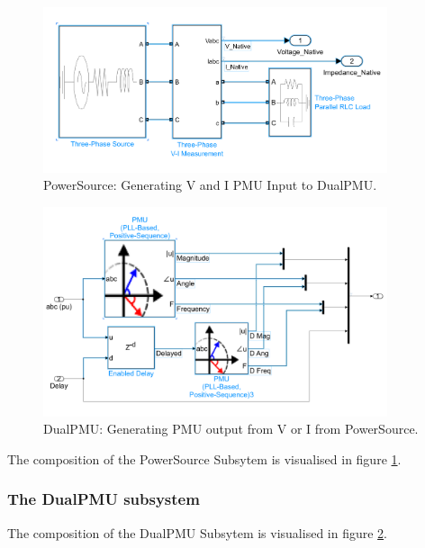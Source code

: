  \begin{figure}
\includegraphics[width=0.9\textwidth]{figures/PowerSourceSubsystem.png}
\caption[PowerSource SIMULINK subsystem]{PowerSource: Generating  V and I PMU Input to DualPMU.}
\label{fig:PowerSource}
\end{figure}
  \begin{figure}
\includegraphics[width=0.9\textwidth]{figures/DualPMUsubsystem.png}
\caption[DualPMU SIMULINK subsystem]{DualPMU: Generating PMU output from V or I from PowerSource.}
\label{fig:DualPMU}
\end{figure}

The composition of the PowerSource Subsytem is visualised in figure \ref{fig:PowerSource}.

\newpage
\subsubsection{The DualPMU subsystem}
The composition of the DualPMU Subsytem is visualised in figure \ref{fig:DualPMU}.

